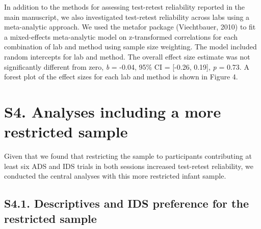 \documentclass[
  english,
  man, donotrepeattitle,floatsintext]{apa6}
\begin{document}
In addition to the methods for assessing test-retest reliability reported in the main manuscript, we also investigated test-retest reliability across labs using a meta-analytic approach.
We used the metafor package (Viechtbauer, 2010) to fit a mixed-effects meta-analytic model on z-transformed correlations for each combination of lab and method using sample size weighting.
The model included random intercepts for lab and method.
The overall effect size estimate was not significantly different from zero, \emph{b} = -0.04, 95\% CI = {[}-0.26, 0.19{]}, \emph{p} = 0.73.
A forest plot of the effect sizes for each lab and method is shown in Figure 4.

\hypertarget{s4.-analyses-including-a-more-restricted-sample}{%
\section{S4. Analyses including a more restricted sample}\label{s4.-analyses-including-a-more-restricted-sample}}

Given that we found that restricting the sample to participants contributing at least six ADS and IDS trials in both sessions increased test-retest reliability, we conducted the central analyses with this more restricted infant sample.

\hypertarget{s4.1.-descriptives-and-ids-preference-for-the-restricted-sample}{%
\subsection{S4.1. Descriptives and IDS preference for the restricted sample}\label{s4.1.-descriptives-and-ids-preference-for-the-restricted-sample}}
\end{document}
